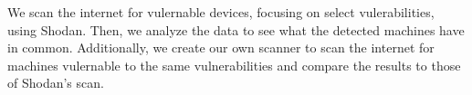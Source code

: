 
We scan the internet for vulernable devices, focusing on select
vulerabilities, using Shodan. Then, we analyze the data to see
what the detected machines have in common. Additionally, we create
our own scanner to scan the internet for machines vulernable to the
same vulnerabilities and compare the results to those of Shodan's
scan.
